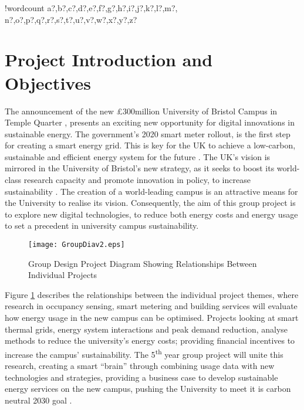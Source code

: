 \documentclass[fontsize=9.5pt]{extarticle}
\numberwithin{figure}{section} %
\newcounter{words}
\newenvironment{counted}{%
  \setcounter{words}{0}
  \SearchList!{wordcount}{\stepcounter{words}}
    {a?,b?,c?,d?,e?,f?,g?,h?,i?,j?,k?,l?,m?,
    n?,o?,p?,q?,r?,s?,t?,u?,v?,w?,x?,y?,z?}
  \UndoBoundary{'}
  \SearchOrder{p;}}{%
  \StopSearching}
\begin{document}
\clearpage
\cfoot{\thepage}
\begin{counted} %
\section{Project Introduction and
Objectives}\label{project-introduction-and-objectives}

The announcement of the new £300million University of Bristol Campus in
Temple Quarter \cite{November58:online}, presents an exciting new
opportunity for digital innovations in sustainable energy. The
government's 2020 smart meter rollout, is the first step for creating a
smart energy grid. This is key for the UK to achieve a low-carbon,
sustainable and efficient energy system for the future
\cite{SmartEne79:online}. The UK's vision is mirrored in the University
of Bristol's new strategy, as it seeks to boost its world-class research
capacity and promote innovation in policy, to increase sustainability
\cite{universi93:online}. The creation of a world-leading campus is an
attractive means for the University to realise its vision. Consequently,
the aim of this group project is to explore new digital technologies, to
reduce both energy costs and energy usage to set a precedent in
university campus sustainability.

\begin{figure}[H]
\centering
\texttt{[image: GroupDiav2.eps]}
\caption{Group Design Project Diagram Showing Relationships Between Individual Projects}
\vspace{-20pt}
\label{groupDia}
\end{figure}

Figure \ref{groupDia} describes the relationships between the individual
project themes, where research in occupancy sensing, smart metering and
building services will evaluate how energy usage in the new campus can
be optimised. Projects looking at smart thermal grids, energy system
interactions and peak demand reduction, analyse methods to reduce the
university's energy costs; providing financial incentives to increase
the campus' sustainability. The 5\textsuperscript{th} year group project
will unite this research, creating a smart ``brain'' \cite{pbmeet}
through combining usage data with new technologies and strategies,
providing a business case to develop sustainable energy services on the
new campus, pushing the University to meet it is carbon neutral 2030
goal \cite{universi93:online}.


\end{counted}
\end{document}
